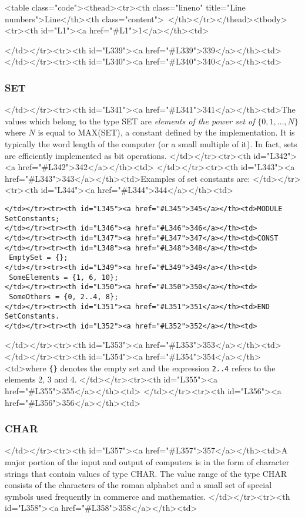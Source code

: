 <table class="code"><thead><tr><th class="lineno" title="Line numbers">Line</th><th class="content"> </th></tr></thead><tbody><tr><th id="L1"><a href="#L1">1</a></th><td>\documentclass[a4paper,11pt]{article}
\begin{document}
</td></tr><tr><th id="L339"><a href="#L339">339</a></th><td>
</td></tr><tr><th id="L340"><a href="#L340">340</a></th><td>\subsubsection{SET} \label{section:SetType}
</td></tr><tr><th id="L341"><a href="#L341">341</a></th><td>The values which belong to the type SET are {\em elements of the power set of} $\{0, 1, \ldots, N\}$ where $N$ is equal to MAX(SET), a constant defined by the implementation. It is typically the word length of the computer (or a small multiple of it). In fact, sets are efficiently implemented as bit operations.
</td></tr><tr><th id="L342"><a href="#L342">342</a></th><td>
</td></tr><tr><th id="L343"><a href="#L343">343</a></th><td>Examples of set constants are:
</td></tr><tr><th id="L344"><a href="#L344">344</a></th><td>\begin{lstlisting}[language=Oberon,frame=none,caption=Using set constants]
</td></tr><tr><th id="L345"><a href="#L345">345</a></th><td>MODULE SetConstants;
</td></tr><tr><th id="L346"><a href="#L346">346</a></th><td>
</td></tr><tr><th id="L347"><a href="#L347">347</a></th><td>CONST
</td></tr><tr><th id="L348"><a href="#L348">348</a></th><td>   EmptySet = {};
</td></tr><tr><th id="L349"><a href="#L349">349</a></th><td>   SomeElements = {1, 6, 10};
</td></tr><tr><th id="L350"><a href="#L350">350</a></th><td>   SomeOthers = {0, 2..4, 8};
</td></tr><tr><th id="L351"><a href="#L351">351</a></th><td>END SetConstants.
</td></tr><tr><th id="L352"><a href="#L352">352</a></th><td>\end{lstlisting}
</td></tr><tr><th id="L353"><a href="#L353">353</a></th><td>
</td></tr><tr><th id="L354"><a href="#L354">354</a></th><td>where \verb+{}+ denotes the empty set and the expression \verb+2..4+ refers to the elements 2, 3 and 4.
</td></tr><tr><th id="L355"><a href="#L355">355</a></th><td>
</td></tr><tr><th id="L356"><a href="#L356">356</a></th><td>\subsubsection{CHAR}
</td></tr><tr><th id="L357"><a href="#L357">357</a></th><td>A major portion of the input and output of computers is in the form of character strings that contain values of type CHAR. The value range of the type CHAR consists of the characters of the roman alphabet and a small set of special symbols used frequently in commerce and mathematics.
</td></tr><tr><th id="L358"><a href="#L358">358</a></th><td>
\end{document}
